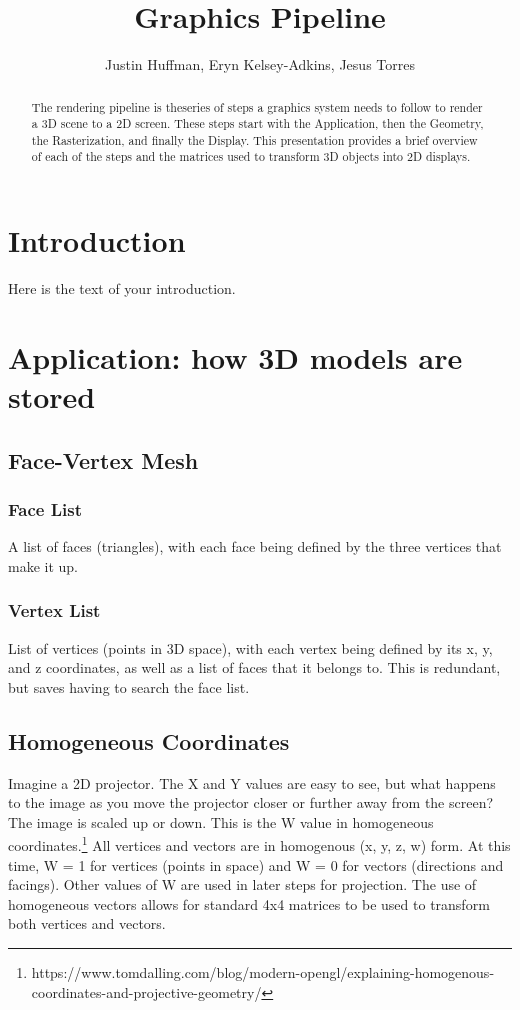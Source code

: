 \documentclass{article}
\begin{document}
\title{Graphics Pipeline}
\author{Justin Huffman, Eryn Kelsey-Adkins, Jesus Torres}

\maketitle

\begin{abstract}
The rendering pipeline is theseries of steps a graphics system needs to follow to render a 3D scene to a 2D screen. These steps start with the Application, then the Geometry, the Rasterization, and finally the Display. This presentation provides a brief overview of each of the steps and the matrices used to transform 3D objects into 2D displays.
\end{abstract}

\section{Introduction}
Here is the text of your introduction.

\section{Application: how 3D models are stored}
\subsection{Face-Vertex Mesh}
\subsubsection{Face List}
A list of faces (triangles), with each face being defined by the three vertices that make it up.

\subsubsection{Vertex List}
List of vertices (points in 3D space), with each vertex being defined by its x, y, and z coordinates, as well as a list of faces that it belongs to. This is redundant, but saves having to search the face list.

\subsection{Homogeneous Coordinates}
Imagine a 2D projector. The X and Y values are easy to see, but what happens to the image as you move the projector closer or further away from the screen? The image is scaled up or down. This is the W value in homogeneous coordinates.\footnote[1]{https://www.tomdalling.com/blog/modern-opengl/explaining-homogenous-coordinates-and-projective-geometry/} All vertices and vectors are in homogenous (x, y, z, w) form. At this time, W = 1 for vertices (points in space) and W = 0 for vectors (directions and facings). Other values of W are used in later steps for projection. The use of homogeneous vectors allows for standard 4x4 matrices to be used to transform both vertices and vectors.
\end{document}

